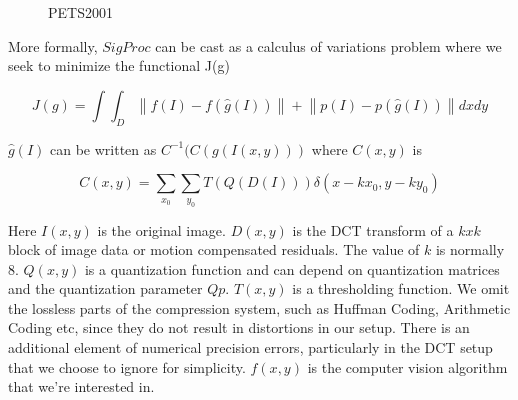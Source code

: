 \documentclass{article}
\begin{document}
\begin{itemize}
\begin{figure}
			\caption{PETS2001} 	
			\label{fig:PicsPETS2001}	
\end{figure}

More formally, $SigProc$ can be cast as a calculus of variations problem where we seek to minimize the functional J(g)

\begin{equation}
\label{eq:CalcOfVarFormulation}
J(g)=\int\int_D \left\|f(I) - f(\hat{g}(I)) \right\|  +  \left\|p(I) - p(\hat{g}(I)) \right\| dxdy
\end{equation}

$\hat{g}(I)$ can be written as $C^{-1}(C(g(I(x,y)))$ where $C(x,y)$ is 

\begin{equation}
\label{eq:DCT}
C(x,y) = \sum_{x_0}\sum_{y_0}T(Q(D(I)))\delta(x-kx_0, y-ky_0)
\end{equation}

Here $I(x,y)$ is the original image.  $D(x,y)$ is the DCT transform of a $kxk$ block of image data or motion compensated residuals.  The value of $k$ is normally 8.  $Q(x,y)$ is a quantization function and can depend on quantization matrices and the quantization parameter $Qp$. $T(x,y)$  is a thresholding function.  We omit the lossless parts of the compression system, such as Huffman Coding, Arithmetic Coding etc, since they do not result in distortions in our setup.  There is an additional element of numerical precision errors, particularly in the DCT setup that we choose to ignore for simplicity.  $f(x,y)$ is the computer vision algorithm that we're interested in.


\end{itemize}
\end{document}
